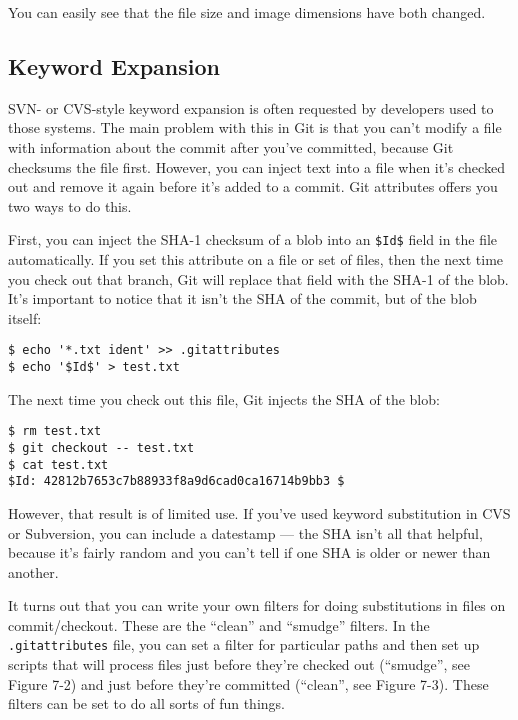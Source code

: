 \documentclass[a4paper]{book}
\begin{document}
You can easily see that the file size and image dimensions have both changed.

\subsection{Keyword Expansion}

SVN- or CVS-style keyword expansion is often requested by developers used to those systems. The main problem with this in Git is that you can't modify a file with information about the commit after you've committed, because Git checksums the file first. However, you can inject text into a file when it's checked out and remove it again before it's added to a commit. Git attributes offers you two ways to do this.

First, you can inject the SHA-1 checksum of a blob into an \texttt{\$Id\$} field in the file automatically. If you set this attribute on a file or set of files, then the next time you check out that branch, Git will replace that field with the SHA-1 of the blob. It's important to notice that it isn't the SHA of the commit, but of the blob itself:

\begin{shaded}\begin{verbatim}
$ echo '*.txt ident' >> .gitattributes
$ echo '$Id$' > test.txt
\end{verbatim}\end{shaded}

The next time you check out this file, Git injects the SHA of the blob:

\begin{shaded}\begin{verbatim}
$ rm test.txt
$ git checkout -- test.txt
$ cat test.txt
$Id: 42812b7653c7b88933f8a9d6cad0ca16714b9bb3 $
\end{verbatim}\end{shaded}

However, that result is of limited use. If you've used keyword substitution in CVS or Subversion, you can include a datestamp --- the SHA isn't all that helpful, because it's fairly random and you can't tell if one SHA is older or newer than another.

It turns out that you can write your own filters for doing substitutions in files on commit/checkout. These are the “clean” and “smudge” filters. In the \texttt{.gitattributes} file, you can set a filter for particular paths and then set up scripts that will process files just before they're checked out (“smudge”, see Figure 7-2) and just before they're committed (“clean”, see Figure 7-3). These filters can be set to do all sorts of fun things.
\end{document}
